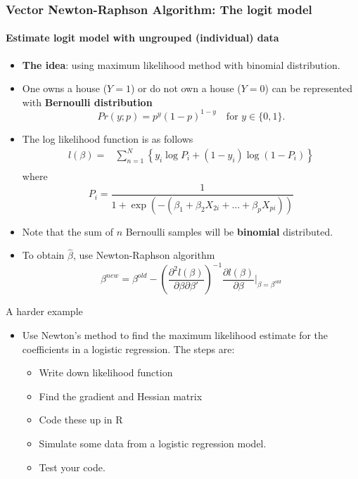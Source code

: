 \documentclass[10pt]{beamer}
\begin{document}
\begin{frame}
  \frametitle{Vector Newton-Raphson Algorithm: The logit model}
  \framesubtitle{Estimate logit model with ungrouped (individual) data}
  \begin{itemize}
  \item \textbf{The idea}: using maximum likelihood method with binomial
    distribution.
  \item One owns a house ($Y=1$) or do not own a house ($Y=0$) can be
    represented with \textbf{Bernoulli distribution}
    \begin{equation*}
      Pr(y;p) = p^y (1-p)^{1-y}\!\quad \text{for }y\in\{0,1\}.
    \end{equation*}
  \item The log likelihood function is as follows
    \begin{equation*}
      \begin{split}
        l(\beta)=& \sum \limits_{n=1}^N\left\{ y_i \log P_i + (1- y_i)
          \log (1-P_i)  \right\}\\
      \end{split}
    \end{equation*}
    where
    \begin{equation*}
      P_i=\frac{1}{1+\exp(-(\beta_1+\beta_2X_{2i}+...+\beta_pX_{pi}))}
    \end{equation*}

  \item Note that the sum of $n$ Bernoulli samples will be \textbf{binomial}
    distributed.

  \item To obtain $\hat \beta$, use Newton-Raphson algorithm
    \begin{equation*}
      \beta^{new} = \beta^{old} - \left(\frac{\partial^2l(\beta)}{\partial
          \beta\partial \beta'}  \right)^{-1} \frac{\partial
        l(\beta)}{\partial\beta} | _{\beta= \beta^{old}}
    \end{equation*}

  \end{itemize}
\end{frame}

\begin{frame}{A harder example}
  \begin{itemize}
  \item Use Newton's method to find the maximum likelihood estimate for the coefficients in a logistic regression. The steps are:
    \begin{itemize}
    \item Write down likelihood function
    \item Find the gradient and Hessian matrix
    \item Code these up in R
    \item Simulate some data from a logistic regression model.
    \item Test your code.
    \end{itemize}
  \end{itemize}
\end{frame}
\end{document}
